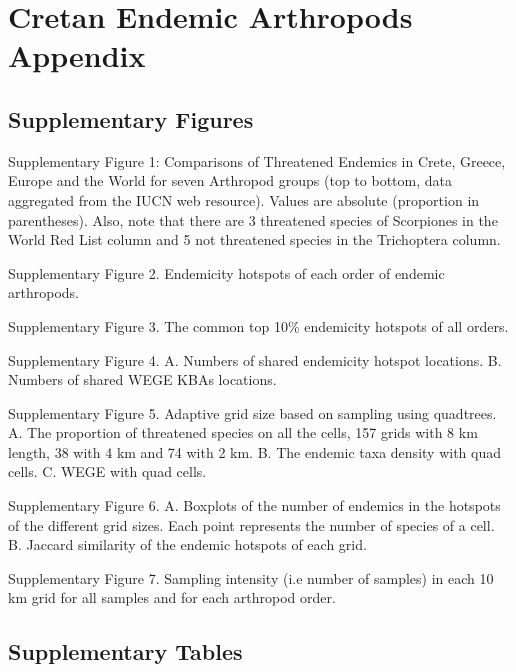 
\chapter{Cretan Endemic Arthropods Appendix} %

\label{AppendixC} 

\section{Supplementary Figures}


Supplementary Figure 1: Comparisons of Threatened Endemics in Crete, Greece, Europe and the World for seven Arthropod groups (top to bottom, data aggregated from the IUCN web resource). Values are absolute (proportion in parentheses). Also, note that there are 3 threatened species of Scorpiones in the World Red List column and 5 not threatened species in the Trichoptera column.


Supplementary Figure 2. Endemicity hotspots of each order of endemic arthropods.


Supplementary Figure 3. The common top 10\% endemicity hotspots of all orders.



Supplementary Figure 4.  A. Numbers of shared endemicity hotspot locations. B. Numbers of shared WEGE KBAs locations.


Supplementary Figure 5. Adaptive grid size based on sampling using quadtrees. A. The proportion of threatened species on all the cells, 157 grids with 8 km length, 38 with 4 km and 74 with 2 km. B. The endemic taxa density with quad cells. C. WEGE with quad cells.

Supplementary Figure 6. A. Boxplots of the number of endemics in the hotspots of the different grid sizes. Each point represents the number of species of a cell. B. Jaccard similarity of the endemic hotspots of each grid.


Supplementary Figure 7. Sampling intensity (i.e number of samples) in each 10 km grid for all samples and for each arthropod order.



\section{Supplementary Tables}



